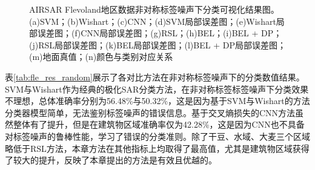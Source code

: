 \begin{figure}[ht!]
    \caption{AIRSAR Flevoland地区数据非对称标签噪声下分类可视化结果图。(a)SVM；(b)Wishart；(c)CNN；(d)SVM局部误差图；(e)Wishart局部误差图；(f)CNN局部误差图；(g)RSL；(h)BEL；(i)BEL + DP；(j)RSL局部误差图；(k)BEL局部误差图；(l)BEL + DP局部误差图；(m)地面真值；(n)颜色与类别对应关系}
    \label{fig:fle_random}
\end{figure}


表\ref{tab:fle_res_random}展示了各对比方法在非对称标签噪声下的分类数值结果。SVM与Wishart作为经典的极化SAR分类方法，在非对称标签标签噪声下分类效果不理想，总体准确率分别为56.48\%与50.32\%，这是因为基于SVM与Wishart的方法分类器模型简单，无法鉴别标签噪声的错误信息。基于交叉熵损失的CNN方法虽然整体有了提升，但是在建筑物区域准确率仅为42.28\%，这是因为CNN也不具备对标签噪声的鲁棒性能，学习了错误的分类准则。除了干豆、水域、大麦三个区域略低于RSL方法，本章方法在其他指标上均取得了最高值，尤其是建筑物区域获得了较大的提升，反映了本章提出的方法是有效且优越的。

